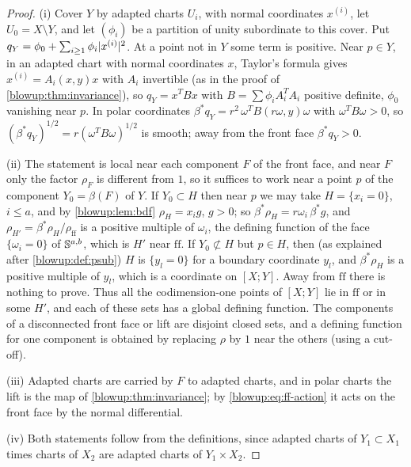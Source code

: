 \begin{proof}
(i) Cover $Y$ by adapted charts $U_i$, with normal coordinates $x^{(i)}$, let $U_0=X\setminus
Y$, and let $(\phi_i)$ be a partition of unity subordinate to this cover. Put
$q_Y=\phi_0+\sum_{i\ge1}\phi_i\lvert x^{(i)}\rvert^2$. At a point not in $Y$ some term is
positive. Near $p\in Y$, in an adapted chart with normal coordinates $x$, Taylor's
formula gives $x^{(i)}=A_i(x,y)x$ with $A_i$ invertible (as in the proof of
\cref{blowup:thm:invariance}), so $q_Y=x^TBx$ with
$B=\sum\phi_iA_i^TA_i$ positive definite, $\phi_0$ vanishing near $p$. In polar
coordinates $\beta^*q_Y=r^2\,\omega^TB(r\omega,y)\omega$ with $\omega^TB\omega>0$, so
$(\beta^*q_Y)^{1/2}=r(\omega^TB\omega)^{1/2}$ is smooth; away from the front face
$\beta^*q_Y>0$.

(ii) The statement is local near each component $F$ of the front face, and near $F$ only
the factor $\rho_F$ is different from $1$, so it suffices to work near a point $p$ of the
component $Y_0=\beta(F)$ of $Y$. If $Y_0\subset H$ then near $p$ we may take $H=\{x_i=0\}$, $i\le a$, and by
\cref{blowup:lem:bdf} $\rho_H=x_ig$, $g>0$; so $\beta^*\rho_H=r\omega_i\,\beta^*g$, and
$\rho_{H'}=\beta^*\rho_H/\rho_{\mathrm{ff}}$ is a positive multiple of $\omega_i$, the
defining function of the face $\{\omega_i=0\}$ of $\mathbb{S}^{a,b}$, which is $H'$ near
$\mathrm{ff}$. If $Y_0\not\subset H$ but $p\in H$, then (as explained after
\cref{blowup:def:psub}) $H$ is $\{y_l=0\}$ for a boundary
coordinate $y_l$, and $\beta^*\rho_H$ is a positive multiple of $y_l$, which is a
coordinate on $[X;Y]$. Away from $\mathrm{ff}$ there is nothing to prove. Thus all the
codimension-one points of $[X;Y]$ lie in $\mathrm{ff}$ or in some $H'$, and each of these
sets has a global defining function. The components of a disconnected front face or
lift are disjoint closed sets, and a defining function for one component is obtained by
replacing $\rho$ by $1$ near the others (using a cut-off).

(iii) Adapted charts are carried by $F$ to adapted charts, and in polar charts the lift
is the map of \cref{blowup:thm:invariance}; by \eqref{blowup:eq:ff-action} it acts on the
front face by the normal differential.

(iv) Both statements follow from the definitions, since adapted charts of $Y_1\subset
X_1$ times charts of $X_2$ are adapted charts of $Y_1\times X_2$.
\end{proof}

